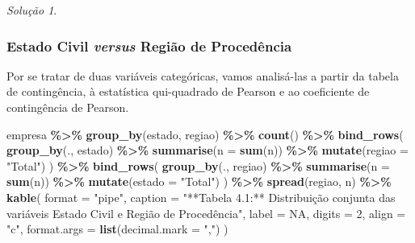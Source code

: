\documentclass[
]{latex/krantz}
\newenvironment{Shaded}{\begin{snugshade}}{\end{snugshade}}
\newcommand{\AttributeTok}[1]{\textcolor[rgb]{0.13,0.29,0.53}{#1}}
\newcommand{\ConstantTok}[1]{\textcolor[rgb]{0.56,0.35,0.01}{#1}}
\newcommand{\DecValTok}[1]{\textcolor[rgb]{0.00,0.00,0.81}{#1}}
\newcommand{\FunctionTok}[1]{\textcolor[rgb]{0.13,0.29,0.53}{\textbf{#1}}}
\newcommand{\NormalTok}[1]{#1}
\newcommand{\SpecialCharTok}[1]{\textcolor[rgb]{0.81,0.36,0.00}{\textbf{#1}}}
\newcommand{\StringTok}[1]{\textcolor[rgb]{0.31,0.60,0.02}{#1}}
\theoremstyle{definition}
\theoremstyle{definition}
\theoremstyle{definition}
\theoremstyle{definition}
\theoremstyle{remark}
\newtheorem*{solution}{Solução}
\begin{document}
\begin{solution}
\hypertarget{estado-civil-versus-regiuxe3o-de-proceduxeancia}{%
\subsubsection*{\texorpdfstring{Estado Civil \emph{versus} Região de Procedência}{Estado Civil versus Região de Procedência}}\label{estado-civil-versus-regiuxe3o-de-proceduxeancia}}

Por se tratar de duas variáveis categóricas, vamos analisá-las a partir da tabela de contingência, à estatística qui-quadrado de Pearson e ao coeficiente de contingência de Pearson.

\begin{Shaded}
\begin{Highlighting}[]
\NormalTok{empresa }\SpecialCharTok{\%\textgreater{}\%}
  \FunctionTok{group\_by}\NormalTok{(estado, regiao) }\SpecialCharTok{\%\textgreater{}\%}
  \FunctionTok{count}\NormalTok{() }\SpecialCharTok{\%\textgreater{}\%}
  \FunctionTok{bind\_rows}\NormalTok{(}
    \FunctionTok{group\_by}\NormalTok{(., estado) }\SpecialCharTok{\%\textgreater{}\%}
      \FunctionTok{summarise}\NormalTok{(}\AttributeTok{n =} \FunctionTok{sum}\NormalTok{(n)) }\SpecialCharTok{\%\textgreater{}\%}
      \FunctionTok{mutate}\NormalTok{(}\AttributeTok{regiao =} \StringTok{"Total"}\NormalTok{)}
\NormalTok{  ) }\SpecialCharTok{\%\textgreater{}\%}
  \FunctionTok{bind\_rows}\NormalTok{(}
    \FunctionTok{group\_by}\NormalTok{(., regiao) }\SpecialCharTok{\%\textgreater{}\%}
      \FunctionTok{summarise}\NormalTok{(}\AttributeTok{n =} \FunctionTok{sum}\NormalTok{(n)) }\SpecialCharTok{\%\textgreater{}\%}
      \FunctionTok{mutate}\NormalTok{(}\AttributeTok{estado =} \StringTok{"Total"}\NormalTok{)}
\NormalTok{  ) }\SpecialCharTok{\%\textgreater{}\%}
  \FunctionTok{spread}\NormalTok{(regiao, n) }\SpecialCharTok{\%\textgreater{}\%}
  \FunctionTok{kable}\NormalTok{(}
    \AttributeTok{format =} \StringTok{"pipe"}\NormalTok{,}
    \AttributeTok{caption =} \StringTok{"**Tabela 4.1:** Distribuição conjunta das variáveis Estado Civil e Região de Procedência"}\NormalTok{,}
    \AttributeTok{label =} \ConstantTok{NA}\NormalTok{,}
    \AttributeTok{digits =} \DecValTok{2}\NormalTok{,}
    \AttributeTok{align =} \StringTok{"c"}\NormalTok{,}
    \AttributeTok{format.args =} \FunctionTok{list}\NormalTok{(}\AttributeTok{decimal.mark =} \StringTok{","}\NormalTok{)}
\NormalTok{  )}
\end{Highlighting}
\end{Shaded}


\end{solution}
\end{document}
